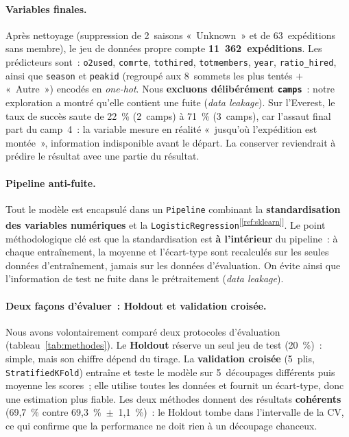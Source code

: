 \documentclass[11pt,a4paper]{article}
\newcommand{\refcite}[1]{\textsuperscript{\textcolor{refblue}{[\ref{#1}]}}}
\begin{document}
\paragraph{Variables finales.} Après nettoyage (suppression de 2~saisons
«~Unknown~» et de 63~expéditions sans membre), le jeu de données propre
compte \textbf{11~362~expéditions}. Les prédicteurs sont~: \texttt{o2used},
\texttt{comrte}, \texttt{tothired}, \texttt{totmembers}, \texttt{year},
\texttt{ratio\_hired}, ainsi que \texttt{season} et \texttt{peakid} (regroupé
aux 8~sommets les plus tentés $+$ «~Autre~») encodés en \textit{one-hot}.
Nous \textbf{excluons délibérément \texttt{camps}}~: notre exploration a montré
qu'elle contient une fuite (\textit{data leakage}). Sur l'Everest, le taux de
succès saute de 22~\% (2~camps) à 71~\% (3~camps), car l'assaut final part du
camp~4~: la variable mesure en réalité «~jusqu'où l'expédition est montée~»,
information indisponible avant le départ. La conserver reviendrait à prédire
le résultat avec une partie du résultat.

\paragraph{Pipeline anti-fuite.} Tout le modèle est encapsulé dans un
\texttt{Pipeline} combinant la \textbf{standardisation des variables
numériques} et la \texttt{LogisticRegression}\refcite{ref:sklearn}. Le point
méthodologique clé est
que la standardisation est \textbf{à l'intérieur} du pipeline~: à chaque
entraînement, la moyenne et l'écart-type sont recalculés sur les seules
données d'entraînement, jamais sur les données d'évaluation. On évite ainsi
que l'information de test ne fuite dans le prétraitement (\textit{data
leakage}).

\paragraph{Deux façons d'évaluer~: Holdout et validation croisée.} Nous avons
volontairement comparé deux protocoles d'évaluation (tableau~\ref{tab:methodes}).
Le \textbf{Holdout} réserve un seul jeu de test (20~\%)~: simple, mais son
chiffre dépend du tirage. La \textbf{validation croisée} (5~plis,
\texttt{StratifiedKFold}) entraîne et teste le modèle sur 5~découpages
différents puis moyenne les scores~; elle utilise toutes les données et fournit
un écart-type, donc une estimation plus fiable. Les deux méthodes donnent des
résultats \textbf{cohérents} (69{,}7~\% contre 69{,}3~\%~$\pm$~1{,}1~\%)~: le
Holdout tombe dans l'intervalle de la CV, ce qui confirme que la performance
ne doit rien à un découpage chanceux.
\end{document}
